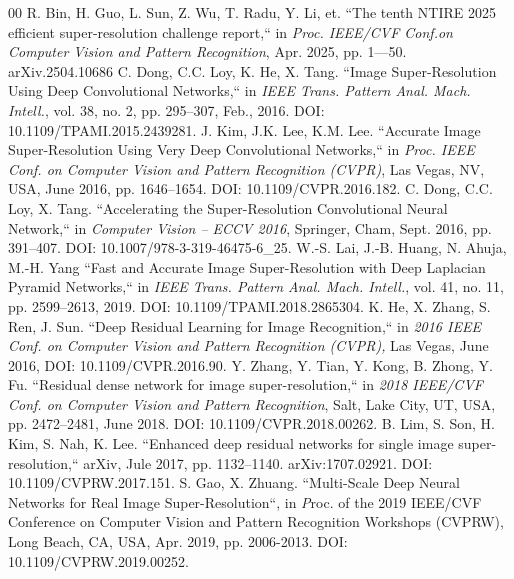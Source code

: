 \documentclass{ieeeaccess}
\begin{document}
{\begin{thebibliography}{00}
R. Bin, H. Guo, L. Sun,  Z. Wu,  T. Radu,  Y. Li, et.  
 ``The tenth NTIRE 2025 efficient super-resolution challenge report,`` in \emph {Proc. IEEE/CVF Conf.on Computer Vision and Pattern Recognition}, Apr. 2025,  pp. 1—50. arXiv.2504.10686
C. Dong, C.C. Loy,  K. He,  X. Tang. 
``Image Super-Resolution Using Deep Convolutional Networks,`` in
\emph {IEEE Trans. Pattern Anal. Mach. Intell.}, 
vol. 38, no. 2, pp. 295–307, Feb., 2016. DOI: 10.1109/TPAMI.2015.2439281.
J. Kim,  J.K. Lee,  K.M.  Lee. 
 ``Accurate Image Super-Resolution Using Very Deep Convolutional Networks,`` in \emph {Proc. IEEE Conf. on Computer Vision and Pattern Recognition (CVPR)}, Las Vegas, NV, USA, June 2016, pp. 1646–1654. DOI: 10.1109/CVPR.2016.182.
C. Dong,  C.C. Loy,  X. Tang.  
``Accelerating the Super-Resolution Convolutional Neural Network,`` 
 in \emph { Computer Vision – ECCV 2016}, Springer,  Cham, Sept. 2016, pp. 391–407. 
 DOI: 10.1007/978-3-319-46475-6\_25.
W.-S. Lai,  J.-B. Huang,  N. Ahuja, M.-H.  Yang 
``Fast and Accurate Image Super-Resolution with Deep Laplacian Pyramid Networks,`` in
\emph {IEEE Trans. Pattern Anal. Mach. Intell.},
vol. 41, no. 11, pp. 2599–2613, 2019. 
DOI: 10.1109/TPAMI.2018.2865304.
K. He, X. Zhang, S. Ren, J. Sun.  
``Deep Residual Learning for Image Recognition,`` 
in \emph {2016 IEEE Conf. on Computer Vision and Pattern Recognition (CVPR),} Las Vegas, June 2016, 
 DOI: 10.1109/CVPR.2016.90.
Y. Zhang, Y. Tian, Y. Kong,  B. Zhong, Y. Fu.  
``Residual dense network for image super-resolution,``
in \emph {2018 IEEE/CVF Conf. on Computer Vision and Pattern Recognition}, Salt, Lake City, UT, USA,  pp. 2472–2481, June 2018.
DOI: 10.1109/CVPR.2018.00262.
B. Lim,  S. Son,  H. Kim,  S. Nah,  K. Lee.  
``Enhanced deep residual networks for single image super-resolution,`` arXiv, Jule 2017, pp. 1132–1140.
arXiv:1707.02921.
DOI: 10.1109/CVPRW.2017.151.
S. Gao,  X. Zhuang.  
``Multi-Scale Deep Neural Networks for Real Image Super-Resolution``, 
in {\emph Proc. of the 2019 IEEE/CVF Conference on Computer Vision and Pattern Recognition Workshops (CVPRW),} Long Beach, CA, USA, Apr. 2019, pp. 2006-2013. DOI: 10.1109/CVPRW.2019.00252.

\end{thebibliography}}
\end{document}
